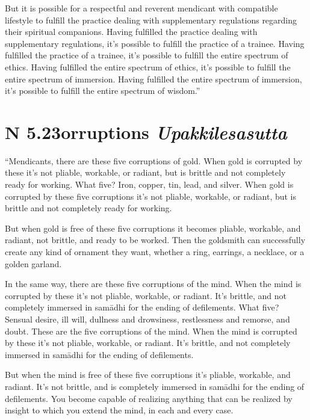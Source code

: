 \documentclass[12pt,openany]{book}%
\newcommand*{\suttatitleacronym}[1]{\smaller[2]{#1}\vspace*{.3em}}
\newcommand*{\suttatitletranslation}[1]{\linebreak{#1}}
\newcommand*{\suttatitleroot}[1]{\linebreak\smaller[2]\itshape{#1}}
\newcommand*{\tocacronym}[1]{\hspace*{-3.3em}{#1}\quad}
\newcommand*{\toctranslation}[1]{#1}
\newcommand*{\tocroot}[1]{(\textit{#1})}
\begin{document}
But it is possible for a respectful and reverent mendicant with compatible lifestyle to fulfill the practice dealing with supplementary regulations regarding their spiritual companions. Having fulfilled the practice dealing with supplementary regulations, it’s possible to fulfill the practice of a trainee. Having fulfilled the practice of a trainee, it’s possible to fulfill the entire spectrum of ethics. Having fulfilled the entire spectrum of ethics, it’s possible to fulfill the entire spectrum of immersion. Having fulfilled the entire spectrum of immersion, it’s possible to fulfill the entire spectrum of wisdom.” 

%
\section*{{\suttatitleacronym AN 5.23}{\suttatitletranslation Corruptions }{\suttatitleroot Upakkilesasutta}}
\addcontentsline{toc}{section}{\tocacronym{AN 5.23} \toctranslation{Corruptions } \tocroot{Upakkilesasutta}}

“Mendicants, there are these five corruptions of gold. When gold is corrupted by these it’s not pliable, workable, or radiant, but is brittle and not completely ready for working. What five? Iron, copper, tin, lead, and silver. When gold is corrupted by these five corruptions it’s not pliable, workable, or radiant, but is brittle and not completely ready for working. 

But when gold is free of these five corruptions it becomes pliable, workable, and radiant, not brittle, and ready to be worked. Then the goldsmith can successfully create any kind of ornament they want, whether a ring, earrings, a necklace, or a golden garland. 

In the same way, there are these five corruptions of the mind. When the mind is corrupted by these it’s not pliable, workable, or radiant. It’s brittle, and not completely immersed in \textsanskrit{samādhi} for the ending of defilements. What five? Sensual desire, ill will, dullness and drowsiness, restlessness and remorse, and doubt. These are the five corruptions of the mind. When the mind is corrupted by these it’s not pliable, workable, or radiant. It’s brittle, and not completely immersed in \textsanskrit{samādhi} for the ending of defilements. 

But when the mind is free of these five corruptions it’s pliable, workable, and radiant. It’s not brittle, and is completely immersed in \textsanskrit{samādhi} for the ending of defilements. You become capable of realizing anything that can be realized by insight to which you extend the mind, in each and every case. 
\end{document}
